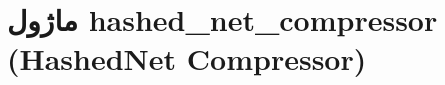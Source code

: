 \section{ماژول hashed\_net\_compressor (HashedNet Compressor)}
\label{sec:module_hashed_net_compressor}
